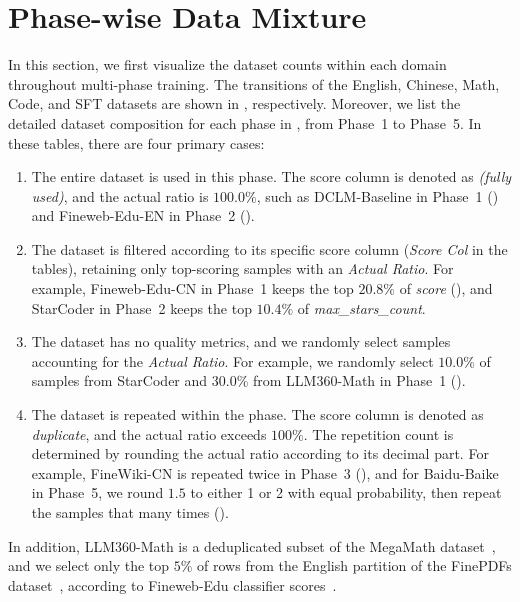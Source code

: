 \section{Phase-wise Data Mixture}
\label{sec:data_mixture_details}

In this section, we first visualize the dataset counts within each domain throughout multi-phase training. The transitions of the English, Chinese, Math, Code, and SFT datasets are shown in , respectively. Moreover, we list the detailed dataset composition for each phase in , from Phase~1 to Phase~5. In these tables, there are four primary cases:
\begin{enumerate}
    \item The entire dataset is used in this phase. The score column is denoted as \textit{(fully used)}, and the actual ratio is $100.0\%$, such as DCLM-Baseline in Phase~1 () and Fineweb-Edu-EN in Phase~2 ().
    \item The dataset is filtered according to its specific score column (\textit{Score Col} in the tables), retaining only top-scoring samples with an \textit{Actual Ratio}. For example, Fineweb-Edu-CN in Phase~1 keeps the top $20.8\%$ of \textit{score} (), and StarCoder in Phase~2 keeps the top $10.4\%$ of \textit{max\_stars\_count}.
    \item The dataset has no quality metrics, and we randomly select samples accounting for the \textit{Actual Ratio}. For example, we randomly select $10.0\%$ of samples from StarCoder and $30.0\%$ from LLM360-Math in Phase~1 ().
    \item The dataset is repeated within the phase. The score column is denoted as \textit{duplicate}, and the actual ratio exceeds $100\%$. The repetition count is determined by rounding the actual ratio according to its decimal part. For example, FineWiki-CN is repeated twice in Phase~3 (), and for Baidu-Baike in Phase~5, we round $1.5$ to either 1 or 2 with equal probability, then repeat the samples that many times ().
\end{enumerate}

In addition, LLM360-Math is a deduplicated subset of the MegaMath dataset~\citep{zhou2025megamath}, and we select only the top $5\%$ of rows from the English partition of the FinePDFs dataset~\citep{kydlicek2025finepdfs}, according to Fineweb-Edu classifier scores~\citep{fineweb}.

